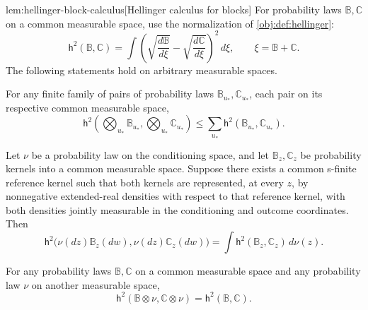 \documentclass[11pt]{article}
\begin{document}
\begin{lemmav}{lem:hellinger-block-calculus}[Hellinger calculus for blocks]
For probability laws \(\mathbb B,\mathbb C\) on a common measurable space, use the normalization of \cref{obj:def:hellinger}:
\[
\mathsf h^2(\mathbb B,\mathbb C)
=\int\left(\sqrt{\frac{d\mathbb B}{d\xi}}
           -\sqrt{\frac{d\mathbb C}{d\xi}}\right)^2\,d\xi,
\qquad \xi=\mathbb B+\mathbb C.
\]
The following statements hold on arbitrary measurable spaces.

For any finite family of pairs of probability laws \(\mathbb B_{u_*},\mathbb C_{u_*}\), each pair on its respective common measurable space,
\[
\mathsf h^2\left(\bigotimes_{u_*}\mathbb B_{u_*},
                \bigotimes_{u_*}\mathbb C_{u_*}\right)
\le \sum_{u_*}\mathsf h^2(\mathbb B_{u_*},\mathbb C_{u_*}).
\]

Let \(\nu\) be a probability law on the conditioning space, and let \(\mathbb B_z,\mathbb C_z\) be probability kernels into a common measurable space. Suppose there exists a common s-finite reference kernel such that both kernels are represented, at every \(z\), by nonnegative extended-real densities with respect to that reference kernel, with both densities jointly measurable in the conditioning and outcome coordinates. Then
\[
\mathsf h^2\bigl(\nu(dz)\mathbb B_z(dw),
                \nu(dz)\mathbb C_z(dw)\bigr)
=\int \mathsf h^2(\mathbb B_z,\mathbb C_z)\,d\nu(z).
\]

For any probability laws \(\mathbb B,\mathbb C\) on a common measurable space and any probability law \(\nu\) on another measurable space,
\[
\mathsf h^2(\mathbb B\otimes\nu,\mathbb C\otimes\nu)
=\mathsf h^2(\mathbb B,\mathbb C).
\]
\end{lemmav}
\end{document}
